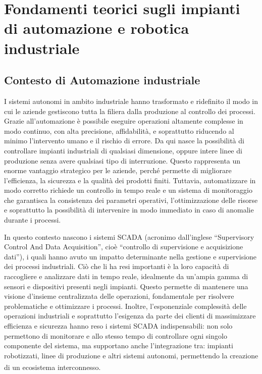 \chapter{Fondamenti teorici sugli impianti di automazione e robotica industriale}

\section{Contesto di Automazione industriale}
I sistemi autonomi in ambito industriale hanno trasformato e ridefinito il modo in cui le aziende gestiscono tutta la filiera dalla produzione al controllo dei processi. Grazie all'automazione è possibile eseguire operazioni altamente complesse in modo continuo, con alta precisione, affidabilità, e soprattutto riducendo al minimo l'intervento umano e il rischio di errore. Da qui nasce la possibilità di controllare impianti industriali di qualsiasi dimensione, oppure intere linee di produzione senza avere qualsiasi tipo di interruzione. Questo rappresenta un enorme vantaggio strategico per le aziende, perché permette di migliorare l'efficienza, la sicurezza e la qualità dei prodotti finiti. Tuttavia, automatizzare in modo corretto richiede un controllo in tempo reale e un sistema di monitoraggio che garantisca la consistenza dei parametri operativi, l'ottimizzazione delle risorse e soprattutto la possibilità di intervenire in modo immediato in caso di anomalie durante i processi.

In questo contesto nascono i sistemi SCADA (acronimo dall’inglese “Supervisory Control And Data Acquisition”, cioè “controllo di supervisione e acquisizione dati”), i quali hanno avuto un impatto determinante nella gestione e supervisione dei processi industriali. Ciò che li ha resi importanti è la loro capacità di raccogliere e analizzare dati in tempo reale, idealmente da un'ampia gamma di sensori e dispositivi presenti negli impianti. Questo permette di mantenere una visione d'insieme centralizzata delle operazioni, fondamentale per risolvere problematiche e ottimizzare i processi. Inoltre, l'esponenziale complessità delle operazioni industriali e soprattutto l'esigenza da parte dei clienti di massimizzare efficienza e sicurezza hanno reso i sistemi SCADA indispensabili: non solo permettono di monitorare e allo stesso tempo di controllare ogni singolo componente del sistema, ma supportano anche l'integrazione tra: impianti robotizzati, linee di produzione e altri sistemi autonomi, permettendo la creazione di un ecosistema interconnesso.\textsuperscript{\cite{sielcosistemi}} 

